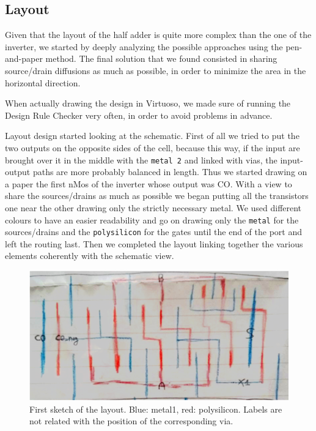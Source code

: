 \documentclass[a4paper]{article}
\begin{document}
\subsection{Layout}
Given that the layout of the half adder is quite more complex than the one of the inverter, we started by deeply analyzing the possible approaches using the pen-and-paper method. The final solution that we found consisted in sharing source/drain diffusions as much as possible, in order to minimize the area in the horizontal direction.

When actually drawing the design in Virtuoso, we made sure of running the Design Rule Checker very often, in order to avoid problems in advance.

Layout design started looking at the schematic. First of all we tried to put the two outputs on the opposite sides of the cell, because this way, if the input are brought over it in the middle with the \texttt{metal 2} and linked with vias, the input-output paths are more probably balanced in length. 
Thus we started drawing on a paper the first nMos of the inverter whose output was CO. With a view to share the sources/drains as much as possible we began putting all the transistors one near the other drawing only the strictly necessary metal.
We used different colours to have an easier readability and go on drawing only the \texttt{metal} for the sources/drains and the \texttt{polysilicon} for the gates until the end of the port and left the routing last. Then we completed the layout linking together the various elements coherently with the schematic view.

\begin{figure}[H]
      \centering
       \includegraphics[width=12cm]{./Images/HA/layout_drw.png}
\caption{First sketch of the layout. Blue: metal1, red: polysilicon. Labels are not related with the position of the corresponding via.}
\label{fig: lay_drw}
\end{figure}
\end{document}
